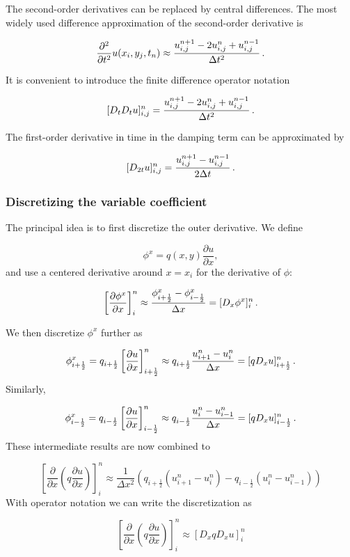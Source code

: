 \documentclass[letterpaper,10pt,english]{/usr/share/sphinx/texinputs/sphinxhowto}
\begin{document}
The second-order derivatives can be replaced by central differences. The
most widely used difference approximation of the second-order derivative
is

\[
\frac{\partial^2}{\partial t^2}u(x_i,y_j,t_n)\approx
\frac{u_{i,j}^{n+1} - 2u_{i,j}^n + u^{n-1}_{i,j}}{\Delta t^2}{\thinspace .}
\]

It is convenient to introduce the finite difference operator notation

\[
[D_tD_t u]^n_{i,j} = \frac{u_{i,j}^{n+1} - 2u_{i,j}^n + u^{n-1}_{i,j}}{\Delta t^2}{\thinspace .}
\]

The first-order derivative in time in the damping term can be
approximated by

\[
[D_{2t} u]^n_{i,j} = \frac{u_{i,j}^{n+1} - u^{n-1}_{i,j}}  {2\Delta t}{\thinspace .}
\]\subsubsection{Discretizing the variable coefficient}

The principal idea is to first discretize the outer derivative. We
define

\[
\phi^x = q(x,y)
\frac{\partial u}{\partial x},
\] and use a centered derivative around $x=x_i$ for the derivative of
$\phi$:

\[
\left[\frac{\partial\phi^x}{\partial x}\right]^n_i
\approx \frac{\phi^x_{i+\frac{1}{2}} - \phi^x_{i-\frac{1}{2}}}{\Delta x}
= [D_x\phi^x]^n_i
\thinspace .
\]

We then discretize $\phi^x$ further as

\[
\phi^x_{i+\frac{1}{2}}  = q_{i+\frac{1}{2}}
\left[\frac{\partial u}{\partial x}\right]^n_{i+\frac{1}{2}}
\approx q_{i+\frac{1}{2}} \frac{u^n_{i+1} - u^n_{i}}{\Delta x}
= [q D_x u]_{i+\frac{1}{2}}^n
\thinspace .
\] Similarly,

\[
\phi^x_{i-\frac{1}{2}}  = q_{i-\frac{1}{2}}
\left[\frac{\partial u}{\partial x}\right]^n_{i-\frac{1}{2}}
\approx q_{i-\frac{1}{2}} \frac{u^n_{i} - u^n_{i-1}}{\Delta x}
= [q D_x u]_{i-\frac{1}{2}}^n
\thinspace .
\] These intermediate results are now combined to

\[
\left[
     \frac{\partial}{\partial x}\left( q
     \frac{\partial u}{\partial x}\right)\right]^n_i
     \approx \frac{1}{\Delta x^2}
     \left( q_{i+\frac{1}{2}} \left({u^n_{i+1} - u^n_{i}}\right)
     - q_{i-\frac{1}{2}} \left({u^n_{i} - u^n_{i-1}}\right)\right)
\] With operator notation we can write the discretization as

\[
\left[
     \frac{\partial}{\partial x}\left( q
     \frac{\partial u}{\partial x}\right)\right]^n_i
     \approx [D_xq D_x u]^n_i
\]
\end{document}

